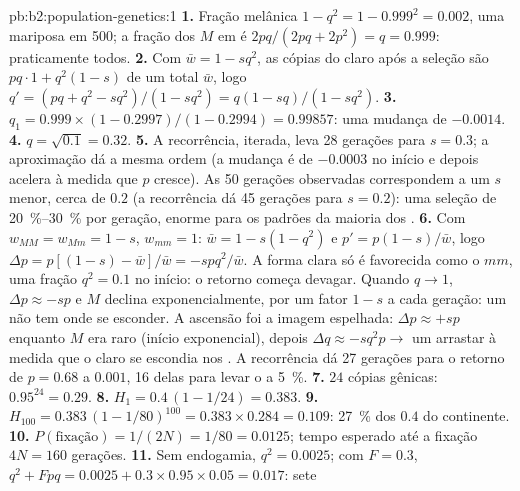 \begin{solution}{pb:b2:population-genetics:1}
\textbf{1.} Fração melânica $1 - q^{2} = 1 - 0.999^{2} = 0.002$,
uma mariposa em 500; a fração dos  $M$ em  é
$2pq/(2pq + 2p^{2}) = q = 0.999$: praticamente todos.
\textbf{2.} Com $\bar w = 1 - sq^{2}$, as cópias do  claro
após a seleção são $pq\cdot 1 + q^{2}(1 - s)$ de um total $\bar w$, logo $q'
= (pq + q^{2} - sq^{2})/(1 - sq^{2}) = q(1 - sq)/(1 - sq^{2})$.
\textbf{3.} $q_1 = 0.999\times(1 - 0.2997)/(1 - 0.2994) = 0.99857$:
uma mudança de $-0.0014$.
\textbf{4.} $q = \sqrt{0.1} = 0.32$.
\textbf{5.} A recorrência, iterada, leva 28 gerações para $s =
0.3$; a aproximação dá a mesma ordem (a mudança é de
$-0.0003$ no início e depois acelera à medida que $p$ cresce). As 50
gerações observadas correspondem a um $s$ menor, cerca de $0.2$ (a recorrência
dá 45 gerações para $s = 0.2$): uma seleção de \qtyrange{20}{30}{\%}
por geração, enorme para os padrões da maioria dos .
\textbf{6.} Com $w_{MM} = w_{Mm} = 1 - s$, $w_{mm} = 1$: $\bar w = 1
- s(1 - q^{2})$ e $p' = p(1 - s)/\bar w$, logo $\Delta p = p[(1 - s) -
\bar w]/\bar w = -spq^{2}/\bar w$. A forma clara só é favorecida como
o  $mm$, uma fração $q^{2} = 0.1$ no início: o
retorno começa devagar. Quando $q \to 1$, $\Delta p \approx -sp$ e $M$
declina exponencialmente, por um fator $1 - s$ a cada geração: um
  não tem onde se esconder. A ascensão foi a imagem
espelhada: $\Delta p \approx +sp$ enquanto $M$ era raro (início
exponencial), depois
$\Delta q \approx -sq^{2}p \to$ um arrastar à medida que o  claro se
escondia nos . A recorrência dá 27 gerações para o retorno
de $p = 0.68$ a $0.001$, 16 delas para levar o  a \qty{5}{\%}.
\textbf{7.} $24$ cópias gênicas: $0.95^{24} = 0.29$.
\textbf{8.} $H_1 = 0.4\,(1 - 1/24) = 0.383$.
\textbf{9.} $H_{100} = 0.383\,(1 - 1/80)^{100} = 0.383\times 0.284 =
0.109$: \qty{27}{\%} dos $0.4$ do continente.
\textbf{10.} $P(\text{fixação}) = 1/(2N) = 1/80 = 0.0125$; tempo
esperado até a fixação $4N = 160$ gerações.
\textbf{11.} Sem endogamia, $q^{2} = 0.0025$; com $F = 0.3$,
$q^{2} + Fpq = 0.0025 + 0.3\times 0.95\times 0.05 = 0.017$: sete

\end{solution}
